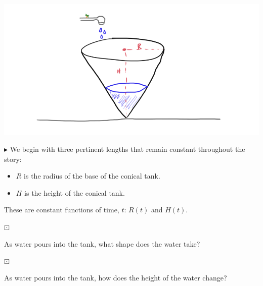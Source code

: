\documentclass{ximera}
\begin{document}
\begin{image}
\includegraphics{pics/cone_3.png}
\end{image}






$\blacktriangleright$ We begin with three pertinent lengths that remain constant throughout the story:

\begin{itemize}
\item $R$ is the radius of the base of the conical tank.
\item $H$ is the height of the conical tank.
\end{itemize}

These are constant functions of time, $t$: $R(t)$ and $H(t)$.







\begin{question} $\boxdot$ 

As water pours into the tank, what shape does the water take?

\begin{multipleChoice}
\end{multipleChoice}

\end{question}









\begin{question} $\boxdot$ 

As water pours into the tank, how does the height of the water change?

\begin{multipleChoice}
\end{multipleChoice}

\end{question}
\end{document}
